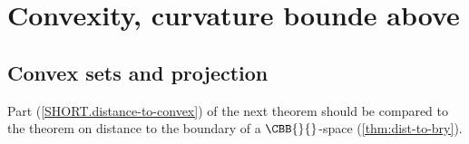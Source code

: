  %
\chapter{Convexity, curvature bounde above}










\section{Convex sets and projection}



Part (\ref{SHORT.distance-to-convex}) of  the next theorem should be compared to the theorem on distance to the boundary of a $\CBB{}{}$-space (\ref{thm:dist-to-bry}).





